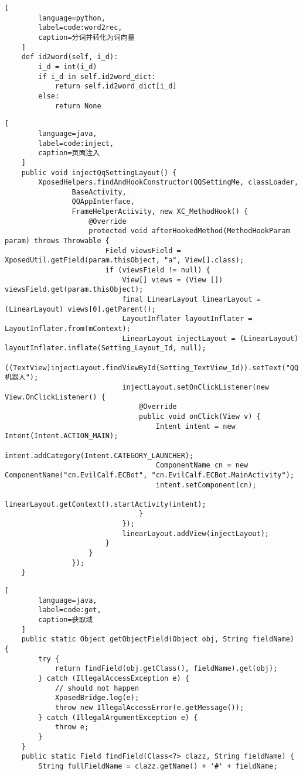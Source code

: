 \begin{appendices}
\begin{lstlisting}[
        language=python,
        label=code:word2rec,
        caption=分词并转化为词向量
    ]
    def id2word(self, i_d):
        i_d = int(i_d)
        if i_d in self.id2word_dict:
            return self.id2word_dict[i_d]
        else:
            return None

    \end{lstlisting}
    \begin{lstlisting}[
        language=java,
        label=code:inject,
        caption=页面注入
    ]
    public void injectQqSettingLayout() {
        XposedHelpers.findAndHookConstructor(QQSettingMe, classLoader,
                BaseActivity,
                QQAppInterface,
                FrameHelperActivity, new XC_MethodHook() {
                    @Override
                    protected void afterHookedMethod(MethodHookParam param) throws Throwable {
                        Field viewsField = XposedUtil.getField(param.thisObject, "a", View[].class);
                        if (viewsField != null) {
                            View[] views = (View []) viewsField.get(param.thisObject);
                            final LinearLayout linearLayout = (LinearLayout) views[0].getParent();
                            LayoutInflater layoutInflater = LayoutInflater.from(mContext);
                            LinearLayout injectLayout = (LinearLayout) layoutInflater.inflate(Setting_Layout_Id, null);
                            ((TextView)injectLayout.findViewById(Setting_TextView_Id)).setText("QQ机器人");
                            injectLayout.setOnClickListener(new View.OnClickListener() {
                                @Override
                                public void onClick(View v) {
                                    Intent intent = new Intent(Intent.ACTION_MAIN);
                                    intent.addCategory(Intent.CATEGORY_LAUNCHER);
                                    ComponentName cn = new ComponentName("cn.EvilCalf.ECBot", "cn.EvilCalf.ECBot.MainActivity");
                                    intent.setComponent(cn);
                                    linearLayout.getContext().startActivity(intent);
                                }
                            });
                            linearLayout.addView(injectLayout);
                        }
                    }
                });
    }
    \end{lstlisting}
    \begin{lstlisting}[
        language=java,
        label=code:get,
        caption=获取域
    ]
    public static Object getObjectField(Object obj, String fieldName) {
		try {
			return findField(obj.getClass(), fieldName).get(obj);
		} catch (IllegalAccessException e) {
			// should not happen
			XposedBridge.log(e);
			throw new IllegalAccessError(e.getMessage());
		} catch (IllegalArgumentException e) {
			throw e;
		}
    }
    public static Field findField(Class<?> clazz, String fieldName) {
		String fullFieldName = clazz.getName() + '#' + fieldName;


\end{lstlisting}
\end{appendices}
